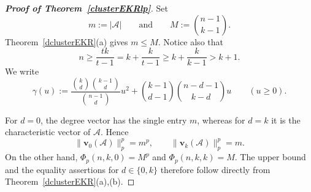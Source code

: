 \documentclass[11pt]{article}
\numberwithin{equation}{section}
\def\A{\mathcal{A}}
\def\v{\mathbf{v}}
\begin{document}
\begin{proof}[{\bf Proof of Theorem~\ref{clusterEKRlp}}]
Set
	\[
	m:=|\A|
	\qquad\text{and}\qquad
	M:=\binom{n-1}{k-1}.
	\]
	Theorem~\ref{dclusterEKR}(a) gives $m\leq M$.
Notice also that
	\[
	n\geq \frac{tk}{t-1}=k+\frac{k}{t-1}
	\geq k+\frac{k}{k-1}>k+1.
	\]
We write
\[
\gamma(u):=
	\frac{\binom kd\binom{k-1}d}{\binom{n-1}d}u^2
	+\binom{k-1}{d-1}\binom{n-d-1}{k-d}u
	\qquad (u\geq0).
\]


	

For $d=0$, the degree vector has the single entry $m$,
whereas for $d=k$ it is the characteristic vector of $\A$.
Hence
	\[
	\|\v_0(\A)\|_p^p=m^p,
	\qquad
	\|\v_k(\A)\|_p^p=m.
	\]
On the other hand,
	$\Phi_p(n,k,0)=M^p$ and $\Phi_p(n,k,k)=M$.
The upper bound and the equality assertions for $d\in\{0,k\}$ therefore follow directly from Theorem~\ref{dclusterEKR}(a),(b).
	






\end{proof}
\end{document}
